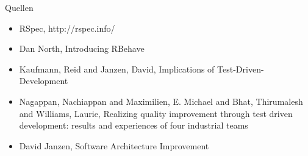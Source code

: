 \documentclass{beamer}
\begin{document}
  \begin{frame}{Quellen}
    \begin{itemize}
      \item RSpec, http://rspec.info/
      \item Dan North, Introducing RBehave
      \item Kaufmann, Reid and Janzen, David, Implications of Test-Driven-Development
      \item Nagappan, Nachiappan and Maximilien, E. Michael and Bhat, Thirumalesh and Williams, Laurie, Realizing quality improvement through test driven development: results and experiences of four industrial teams
      \item David Janzen, Software Architecture Improvement
    \end{itemize}
  \end{frame}
\end{document}
